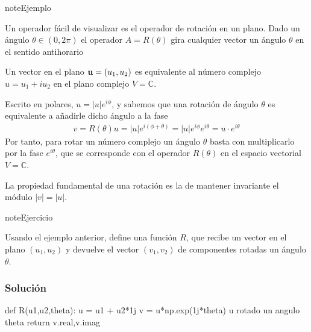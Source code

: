 \documentclass[letterpaper,10pt,english]{jupyterBook}
\begin{document}
\begin{sphinxadmonition}{note}{Ejemplo}

\sphinxAtStartPar
Un operador  fácil de visualizar es el operador de rotación en un plano. Dado un ángulo \(\theta \in (0,2\pi)\) el operador \(A = R(\theta)\) gira cualquier vector un ángulo \(\theta\) en el sentido antihorario

\sphinxAtStartPar
Un vector en el plano \({\bf u} =  (u_1,u_2)\)  es equivalente al número complejo \(u = u_1 + i u_2\) en el plano complejo \(V = {\mathbb C}\).

\sphinxAtStartPar
Escrito en polares, \(u=|u|e^{i\phi}\), y sabemos que una rotación de ángulo \(\theta\) es equivalente a añadirle dicho  ángulo a la fase
\begin{equation*}
\begin{split}
 v = R(\theta) u = |u| e^{i(\phi + \theta)} =  |u| e^{i\phi } e^{i\theta} = u\cdot e^{i\theta} 
\end{split}
\end{equation*}
\sphinxAtStartPar
Por tanto, para rotar un número complejo un ángulo \(\theta\) basta con multiplicarlo por la fase \(e^{i\theta}\), que se corresponde con el operador \(R(\theta)\) en el espacio vectorial \(V = \mathbb{C}\).

\sphinxAtStartPar
La propiedad fundamental de una rotación es la de mantener invariante el módulo  \(|v| = |u|\).
\end{sphinxadmonition}

\begin{sphinxadmonition}{note}{Ejercicio}

\sphinxAtStartPar
Usando el ejemplo anterior, define una función \(R\), que recibe un vector en el plano \((u_1,u_2)\) y devuelve el vector \((v_1,v_2)\) de componentes rotadas un ángulo \(\theta\).
\subsubsection*{Solución}

\begin{sphinxVerbatim}[commandchars=\\\{\}]
def R(u1,u2,theta):
    u = u1 + u2*1j
    v = u*np.exp(1j*theta) \PYGZsh{} u rotado un angulo theta
    return v.real,v.imag    
\end{sphinxVerbatim}
\end{sphinxadmonition}
\end{document}

